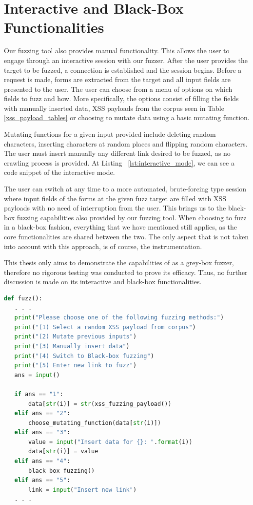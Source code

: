 \section{Interactive and Black-Box Functionalities}
Our fuzzing tool also provides manual functionality. This allows the user to engage through an interactive session with our fuzzer. After the user provides the target to be fuzzed, a connection is established and the session begins. Before a request is made, forms are extracted from the target and all input fields are presented to the user. The user can choose from a menu of options on which fields to fuzz and how. More specifically, the options consist of filling the fields with manually inserted data, XSS payloads from the corpus seen in Table \ref{xss_payload_tables} or choosing to mutate data using a basic mutating function. 

Mutating functions for a given input provided include deleting random characters, inserting characters at random places and flipping random characters. The user must insert manually any different link desired to be fuzzed, as no crawling process is provided. At Listing ~\ref{lst:interactive_mode}, we can see a code snippet of the interactive mode. 

The user can switch at any time to a more automated, brute-forcing type session where input fields of the forms at the given fuzz target are filled with XSS payloads with no need of interruption from the user. This brings us to the black-box fuzzing capabilities also provided by our fuzzing tool. When choosing to fuzz in a black-box fashion, everything that we have mentioned still applies, as the core functionalities are shared between the two. The only aspect that is not taken into account with this approach, is of course, the instrumentation.

This thesis only aims to demonstrate the capabilities of \pname{} as a grey-box fuzzer, therefore no rigorous testing was conducted to prove its efficacy. Thus, no further discussion is made on its interactive and black-box functionalities.

\begin{lstlisting}[aboveskip=\baselineskip, showstringspaces=false, frame=single, language=Python, columns=flexible, keepspaces=true, caption={\textit{Options menu and their processing during interactive mode fuzzing}}, numberstyle=\color{gray}, numbersep=5pt, label={lst:interactive_mode}]
def fuzz():
   . . .
   print("Please choose one of the following fuzzing methods:")
   print("(1) Select a random XSS payload from corpus")
   print("(2) Mutate previous inputs")
   print("(3) Manually insert data")
   print("(4) Switch to Black-box fuzzing")
   print("(5) Enter new link to fuzz")
   ans = input()
   
   if ans == "1":
       data[str(i)] = str(xss_fuzzing_payload())
   elif ans == "2":
       choose_mutating_function(data[str(i)])
   elif ans == "3":
       value = input("Insert data for {}: ".format(i))
       data[str(i)] = value
   elif ans == "4":
       black_box_fuzzing()
   elif ans == "5":
       link = input("Insert new link")
   . . .
     
\end{lstlisting}

